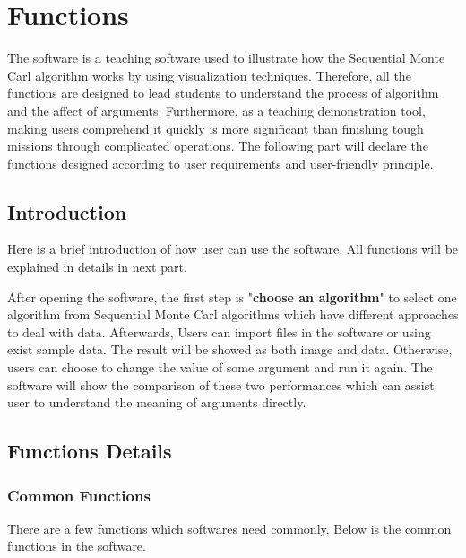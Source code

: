 \documentclass{article}
\begin{document}
\section{Functions}
The software is a teaching software used to illustrate how the Sequential Monte Carl algorithm works by using visualization techniques. Therefore, all the functions are designed to lead students to understand the process of  algorithm and the affect of arguments. Furthermore, as a teaching demonstration tool, making users comprehend it quickly is more significant than finishing tough missions through complicated operations. The following part will declare the functions designed according to user requirements and user-friendly principle.
    \subsection{Introduction}
     Here is a brief introduction of how user can use the software. All functions will be explained in details in next part.

     After opening the software, the first step is "\textbf{choose an algorithm}" to select one algorithm from Sequential Monte Carl algorithms which have different approaches to deal with data.%
     Afterwards, Users can import files in the software or using exist sample data. The result will be showed as both image and data. Otherwise, users can choose to change the value of some argument and run it again. The software will show the comparison of these two performances which can assist user to understand the meaning of arguments directly.

    \subsection{Functions Details}
    \subsubsection{Common Functions}
   There are a few functions which softwares need commonly. Below is the common functions in the software.
\end{document}
